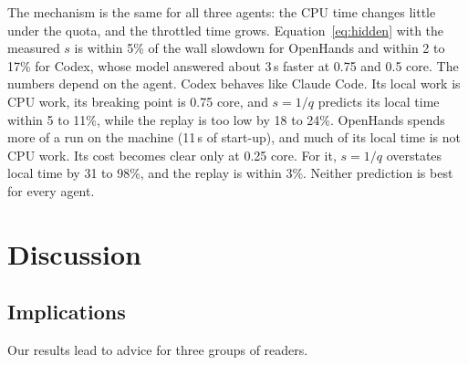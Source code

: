 \documentclass[sigconf,review,anonymous]{acmart}
\begin{document}
\begin{table}[t]
\caption{Three agents under a CPU quota on \texttt{t3} (M0, medians of 5
runs; Claude Code from set~1). $f$: local share with no limit. CPU time
and throttled time are from the cgroup counter.}
\label{tab:agents}
\end{table}

The mechanism is the same for all three agents: the CPU time changes
little under the quota, and the throttled time grows.
Equation~\ref{eq:hidden} with the measured $s$ is within 5\% of the wall
slowdown for OpenHands and within 2 to 17\% for Codex, whose model
answered about 3\,s faster at 0.75 and 0.5 core. The numbers depend on
the agent. Codex behaves like Claude Code. Its local work is CPU work,
its breaking point is 0.75 core, and $s = 1/q$ predicts its local time
within 5 to 11\%, while the replay is too low by 18 to 24\%. OpenHands
spends more of a run on the machine (11\,s of start-up), and much of its
local time is not CPU work. Its cost becomes clear only at 0.25 core.
For it, $s = 1/q$ overstates local time by 31 to 98\%, and the replay is
within 3\%. Neither prediction is best for every agent.

\section{Discussion}\label{sec:discussion}

\subsection{Implications}\label{sec:implications}

Our results lead to advice for three groups of readers.
\end{document}
